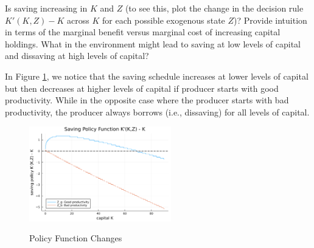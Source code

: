 \newpage

\begin{framedexercise}
    Is saving increasing in $K$ and $Z$ (to see this, plot the change in the decision rule
    $K'(K,Z) - K$ across $K$ for each possible exogenous state $Z$)?
    Provide intuition in terms of the marginal benefit versus marginal cost
    of increasing capital holdings. What in the environment might lead to
    saving at low levels of capital and dissaving at high levels of capital?
\end{framedexercise}

\begin{solution} \par In Figure \ref{fig:Policy_changes_stochastic}, we notice that the saving schedule
    increases at lower levels of capital but then decreases at higher levels of capital
    if producer starts with good productivity.
    While in the opposite case where the producer starts with bad productivity,
    the producer always borrows (i.e., dissaving) for all levels of capital.

    \begin{figure}[H]
        \centering
        \caption{Policy Function Changes}
        \includegraphics[width=0.55\textwidth, angle=0]
        {Parallel_Stochastic_Policy_Functions_Changes.png}
        \label{fig:Policy_changes_stochastic}
    \end{figure}


\end{solution}
